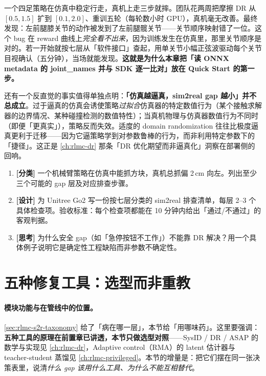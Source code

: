 \begin{insight}\label{ins:rlmc-s2r-system}
一个四足策略在仿真中稳定行走，真机上走三步就摔。团队花两周把摩擦 DR 从 $[0.5,1.5]$ 扩到 $[0.1,2.0]$、重训五轮（每轮数小时 GPU），真机毫无改善。最终发现：左前腿膝关节的动作被发到了左前腿髋关节——关节顺序映射错了一位。这个 bug 在 reward 曲线上\emph{完全看不出来}，因为训练发生在仿真里，那里关节顺序是对的。若一开始就按七层从「软件接口」查起，用单关节小幅正弦波驱动每个关节目视确认（五分钟），当场就能发现。\textbf{这就是为什么本章把「读 ONNX metadata 的 joint\_names 并与 SDK 逐一比对」放在 Quick Start 的第一步。}
\end{insight}

还有一个反直觉的事实值得单独点明：\textbf{「仿真越逼真，sim2real gap 越小」并不总成立}。过于逼真的仿真会诱使策略\emph{过拟合}仿真器的特定数值行为（某个接触求解器的边界情况、某种碰撞检测的数值特性）；当真机物理与仿真器数值行为不同时（即便「更真实」），策略反而失效。适度的 domain randomization 往往比极度逼真更利于迁移——因为它逼策略学到对参数鲁棒的行为，而非利用特定参数下的「捷径」。这正是 \cref{ch:rlmc-dr} 那条「DR 优化期望而非逼真化」洞察在部署侧的回响。

\begin{practice}[七层分类动手]
\begin{enumerate}
  \item \textbf{[分类]} 一个机械臂策略在仿真中能抓方块，真机总抓偏 2\,cm 向左。列出至少三个可能的 gap 层及对应排查步骤。
  \item \textbf{[设计]} 为 Unitree Go2 写一份按七层分类的 sim2real 排查清单，每层 2--3 个具体检查项。验收标准：每个检查项都能在 10 分钟内给出「通过/不通过」的客观判据。
  \item \textbf{[思考]} 为什么安全 gap（如「急停按钮不工作」）不能靠 DR 解决？用一个具体例子说明它是确定性工程缺陷而非参数不确定性。
\end{enumerate}
\end{practice}

\section{五种修复工具：选型而非重教}
\label{sec:rlmc-s2r-methods}

\paragraph{模块功能与在管线中的位置。}\cref{sec:rlmc-s2r-taxonomy} 给了「病在哪一层」，本节给「用哪味药」。这里要强调：\textbf{五种工具的原理在前置章已讲透，本节只做选型对照}——SysID / DR / ASAP 的数学与实现见 \cref{ch:rlmc-dr}，Adaptive control（RMA）的 latent 估计器与 teacher-student 蒸馏见 \cref{ch:rlmc-privileged}。本节的增量是：把它们摆在同一张决策表里，说清\emph{什么 gap 该用什么工具、为什么不能互相替代}。

